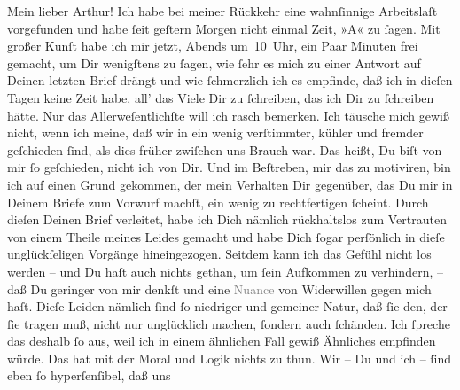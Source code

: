 \begin{ledgroupsized}[t]{13cm}
           \pstart\center{}Mein lieber Arthur!\pend\pstart
           Ich habe bei meiner Rückkehr eine wahnſinnige Arbeitslaſt vorgefunden und habe ſeit
                  geſtern{ }Morgen nicht einmal Zeit, »A« zu ſagen. Mit großer Kunſt habe ich mir
               jetzt, Abends um 10 Uhr, ein\strikeout{\textcolor{gray}{e Pa}} Paar Minuten frei gemacht, um Dir wenigſtens zu ſagen, wie ſehr es mich zu
               einer Antwort auf Deinen letzten Brief drängt und wie ſchmerzlich ich es empfinde,
               daß ich in dieſen Tagen keine Zeit habe, all’ das Viele {\pb}Dir zu ſchreiben, das ich Dir zu ſchreiben
               hätte.\pend
           \pstart
           Nur das Allerweſentlichſte will ich rasch bemerken. Ich täusche mich gewiß nicht,
               wenn ich meine, daß wir in \label{K_L02651-1v}\label{K_L02651-1h} ein wenig verſtimmter, kühler und fremder geſchieden ſind,
               als dies früher zwiſchen uns Brauch war. Das heißt, Du biſt von mir ſo geſchieden,
               nicht ich von Dir. Und im Beſtreben, mir das zu motiviren, bin ich auf einen Grund
               gekommen, der mein Verhalten Dir gegenüber, das Du mir in Deinem Briefe zum Vorwurf
               machſt, ein wenig zu rechtfertigen ſcheint. Durch dieſen Deinen Brief verleitet, habe
               ich Dich nämlich rückhaltslos zum Vertrauten von einem Theile meines Leides gemacht
               und habe Dich ſogar perſönlich in dieſe unglückſeligen Vorgänge hineingezogen.
               Seitdem kann ich das Gefühl {\pb}nicht los werden – und
               Du haſt auch nichts gethan, um ſein Aufkommen zu verhindern, – daß Du geringer von
               mir denkſt und eine \textcolor{gray}{Nuance} von Widerwillen gegen mich haſt. Dieſe
               Leiden nämlich ſind ſo niedriger und gemeiner Natur, daß ſie den, der ſie tragen muß,
               nicht nur unglücklich machen, ſondern auch ſchänden. Ich ſpreche das deshalb ſo aus,
               weil ich in einem ähnlichen Fall gewiß Ähnliches empfinden würde. Das hat mit der
               Moral und  Logik nichts zu thun. Wir – Du und ich – ſind eben ſo hyperſenſibel, daß uns

\end{ledgroupsized}
